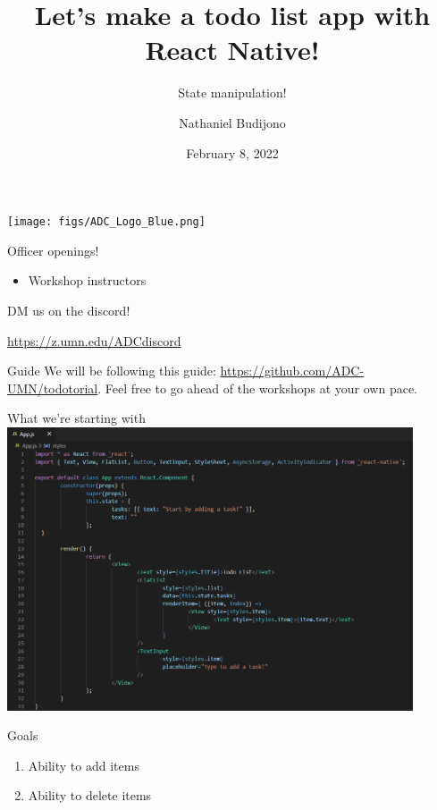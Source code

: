 \documentclass{beamer}
\title{Let's make a todo list app with React Native!}
\subtitle{State manipulation!}
\author{Nathaniel Budijono}
\date{February 8, 2022}
\institute{UMN ADC}
\begin{document}
\begin{frame}
    \titlepage
    \texttt{[image: figs/ADC\_Logo\_Blue.png]}
\end{frame}

\begin{frame}{Officer openings!}
	\begin{itemize}
		\item Workshop instructors
	\end{itemize}

	\bigskip

	DM us on the discord!

	\bigskip

	\href{https://z.umn.edu/ADCdiscord}{https://z.umn.edu/ADCdiscord}
\end{frame}

\begin{frame}{Guide}
	We will be following this guide: \href{https://github.com/ADC-UMN/todotorial}{https://github.com/ADC-UMN/todotorial}. Feel free to go ahead of the workshops at your own pace.
\end{frame}

\begin{frame}{What we're starting with}
	\centering
	\includegraphics[width=0.9\textwidth]{figs/after-styles.png}	
\end{frame}

\begin{frame}{Goals}
	\begin{enumerate}
		\item Ability to add items \pause
		\item Ability to delete items
	\end{enumerate}
\end{frame}
\end{document}
